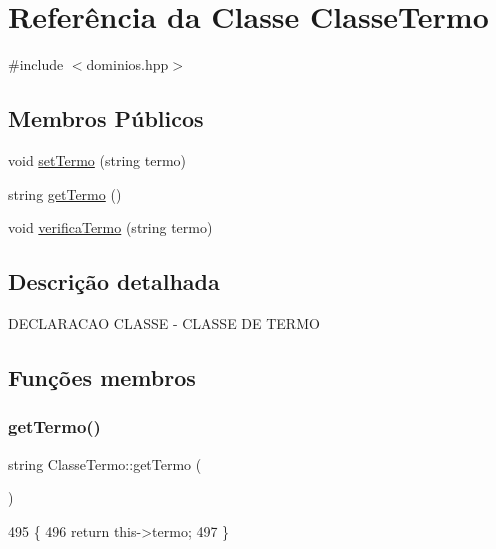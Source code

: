 \hypertarget{class_classe_termo}{}\section{Referência da Classe Classe\+Termo}
\label{class_classe_termo}


{\ttfamily \#include $<$dominios.\+hpp$>$}

\subsection*{Membros Públicos}
\begin{DoxyCompactItemize}
\item 
void \mbox{\hyperlink{class_classe_termo_a9392585ac39c1ed25ad54f0902138457}{set\+Termo}} (string termo)
\item 
string \mbox{\hyperlink{class_classe_termo_acef132214ef8a667c9b9ca262fe7a9da}{get\+Termo}} ()
\item 
void \mbox{\hyperlink{class_classe_termo_a950f042edfb8e2e40caafba76a636c93}{verifica\+Termo}} (string termo)
\end{DoxyCompactItemize}


\subsection{Descrição detalhada}
D\+E\+C\+L\+A\+R\+A\+C\+AO C\+L\+A\+S\+SE -\/ C\+L\+A\+S\+SE DE T\+E\+R\+MO 

\subsection{Funções membros}
\mbox{\label{class_classe_termo_acef132214ef8a667c9b9ca262fe7a9da}} 
\subsubsection{\texorpdfstring{get\+Termo()}{getTermo()}}
{\footnotesize\ttfamily string Classe\+Termo\+::get\+Termo (\begin{DoxyParamCaption}{ }\end{DoxyParamCaption})}


\begin{DoxyCode}
495 \{
496   \textcolor{keywordflow}{return} this->termo;
497 \}
\end{DoxyCode}
\mbox{\label{class_classe_termo_a9392585ac39c1ed25ad54f0902138457}} 
